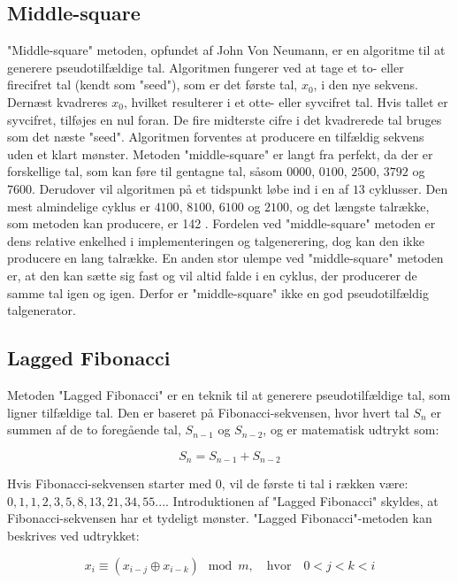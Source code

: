 \subsection{Middle-square}
"Middle-square" metoden, opfundet af John Von Neumann, er en algoritme til at generere pseudotilfældige tal. Algoritmen fungerer ved at tage et to- eller firecifret tal (kendt som "seed"), som er det første tal, $x_0$, i den nye sekvens. Dernæst kvadreres $x_0$, hvilket resulterer i et otte- eller syvcifret tal. Hvis tallet er syvcifret, tilføjes en nul foran. De fire midterste cifre i det kvadrerede tal bruges som det næste "seed". Algoritmen forventes at producere en tilfældig sekvens uden et klart mønster.
\noindent Metoden "middle-square" er langt fra perfekt, da der er forskellige tal, som kan føre til gentagne tal, såsom $0000$, $0100$, $2500$, $3792$ og $7600$. Derudover vil algoritmen på et tidspunkt løbe ind i en af $13$ cyklusser. Den mest almindelige cyklus er $4100$, $8100$, $6100$ og $2100$, og det længste talrække, som metoden kan producere, er 142 \cite{Knuth1998}.
\noindent Fordelen ved "middle-square" metoden er dens relative enkelhed i implementeringen og talgenerering, dog kan den ikke producere en lang talrække. En anden stor ulempe ved "middle-square" metoden er, at den kan sætte sig fast og vil altid falde i en cyklus, der producerer de samme tal igen og igen. Derfor er "middle-square" ikke en god pseudotilfældig talgenerator.


\subsection{Lagged Fibonacci}
Metoden "Lagged Fibonacci" er en teknik til at generere pseudotilfældige tal, som ligner tilfældige tal. Den er baseret på Fibonacci-sekvensen, hvor hvert tal $S_n$ er summen af de to foregående tal, $S_{n-1}$ og $S_{n-2}$, og er matematisk udtrykt som:

$$S_n=S_{n-1}+S_{n-2}$$

\noindent Hvis Fibonacci-sekvensen starter med $0$, vil de første ti tal i rækken være: $0,1,1,2,3,5,8,13,21,34,55...$. Introduktionen af "Lagged Fibonacci" skyldes, at Fibonacci-sekvensen har et tydeligt mønster. "Lagged Fibonacci"-metoden kan beskrives ved udtrykket:

$$x_i \equiv (x_{i-j} \oplus x_{i-k}) \mod m, \quad \text{hvor} \quad 0<j<k<i$$

